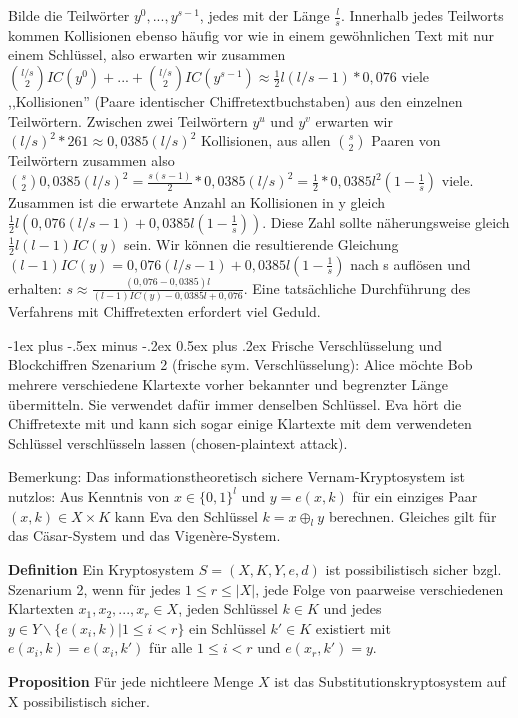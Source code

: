 \documentclass[a4paper]{article}
\makeatletter
\renewcommand{\section}{\@startsection{section}{1}{0mm}%
 {-1ex plus -.5ex minus -.2ex}%
 {0.5ex plus .2ex}%
 {\normalfont\large\bfseries}}
\makeatother
\begin{document}
\begin{multicols}{3}
    Bilde die Teilwörter $y^0,...,y^{s-1}$, jedes mit der Länge $\frac{l}{s}$. Innerhalb jedes Teilworts kommen Kollisionen ebenso häufig vor wie in einem gewöhnlichen Text mit nur einem Schlüssel, also erwarten wir zusammen $\binom{l/s}{2} IC(y^0)+...+\binom{l/s}{2} IC(y^{s-1})\approx\frac{1}{2}l(l/s-1)* 0,076$ viele ,,Kollisionen'' (Paare identischer Chiffretextbuchstaben) aus den einzelnen Teilwörtern.
    Zwischen zwei Teilwörtern $y^u$ und $y^v$ erwarten wir $(l/s)^2*261\approx 0,0385(l/s)^2$ Kollisionen, aus allen $\binom{s}{2}$ Paaren von Teilwörtern zusammen also $\binom{s}{2} 0,0385(l/s)^2 =\frac{s(s-1)}{2}* 0,0385(l/s)^2 =\frac{1}{2} *0,0385 l^2 (1-\frac{1}{s})$ viele. Zusammen ist die erwartete Anzahl an Kollisionen in y gleich $\frac{1}{2}l(0,076(l/s-1) + 0,0385 l(1-\frac{1}{s}))$.
    Diese Zahl sollte näherungsweise gleich $\frac{1}{2}l(l-1)IC(y)$ sein. Wir können die resultierende Gleichung $(l-1)IC(y) = 0,076(l/s-1) + 0,0385 l(1-\frac{1}{s})$ nach s auflösen und erhalten: $s\approx \frac{(0,076-0,0385)l}{(l-1)IC(y)-0,0385l+0,076}$.
    Eine tatsächliche Durchführung des Verfahrens mit Chiffretexten erfordert viel Geduld.

    \section{Frische Verschlüsselung und Blockchiffren}
    Szenarium 2 (frische sym. Verschlüsselung): Alice möchte Bob mehrere verschiedene Klartexte vorher bekannter und begrenzter Länge übermitteln. Sie verwendet dafür immer denselben Schlüssel. Eva hört die Chiffretexte mit und kann sich sogar einige Klartexte mit dem verwendeten Schlüssel verschlüsseln lassen (chosen-plaintext attack).

    Bemerkung: Das informationstheoretisch sichere Vernam-Kryptosystem ist nutzlos: Aus Kenntnis von $x\in\{0,1\}^l$ und $y=e(x,k)$ für ein einziges Paar $(x,k)\in X\times K$ kann Eva den Schlüssel $k=x\oplus_l y$ berechnen. Gleiches gilt für das Cäsar-System und das Vigenère-System.

    \textbf{Definition} Ein Kryptosystem $S=(X,K,Y,e,d)$ ist possibilistisch sicher bzgl. Szenarium 2, wenn für jedes $1 \leq r\leq |X|$, jede Folge von paarweise verschiedenen Klartexten $x_1,x_2,...,x_r\in X$, jeden Schlüssel $k\in K$ und jedes $y\in Y\backslash\{e(x_i,k)| 1 \leq i < r\}$ ein Schlüssel $k'\in K$ existiert mit $e(x_i,k)=e(x_i,k')$ für alle $1\leq i< r$ und $e(x_r,k')=y$.

    \textbf{Proposition} Für jede nichtleere Menge $X$ ist das Substitutionskryptosystem auf X possibilistisch sicher.


\end{multicols}
\end{document}
